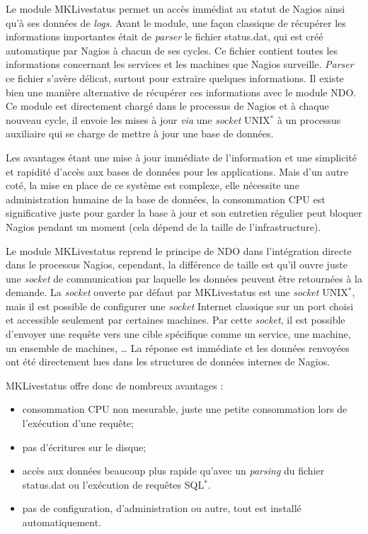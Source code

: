 Le module MKLivestatus permet un acc\`es imm\'ediat au statut de Nagios ainsi qu'\`a ses donn\'ees de \textit{logs}.
Avant le module, une fa\c{c}on classique de r\'ecup\'erer les informations importantes \'etait de \textit{parser} le fichier \textsf{status.dat}, qui est cr\'e\'e automatique par Nagios \`a chacun de ses cycles.
Ce fichier contient toutes les informations concernant les services et les machines que Nagios surveille.
\textit{Parser} ce fichier s'av\`ere d\'elicat, surtout pour extraire quelques informations.
Il existe bien une mani\`ere alternative de r\'ecup\'erer ces informations avec le module NDO.
Ce module est directement charg\'e dans le processus de Nagios et \`a chaque nouveau cycle, il envoie les mises \`a jour \textit{via} une \textit{socket} UNIX$^*$ \`a un processus auxiliaire qui se charge de mettre \`a jour une base de donn\'ees.

Les avantages \'etant une mise \`a jour imm\'ediate de l'information et une simplicit\'e et rapidit\'e d'acc\`es aux bases de donn\'ees pour les applications.
Mais d'un autre cot\'e, la mise en place de ce syst\`eme est complexe, elle n\'ecessite une administration humaine de la base de donn\'ees, la consommation CPU est significative juste pour garder la base \`a jour et son entretien r\'egulier peut bloquer Nagios pendant un moment (cela d\'epend de la taille de l'infrastructure).

Le module MKLivestatus reprend le principe de NDO dans l'int\'egration directe dans le processus Nagios, cependant, la diff\'erence de taille est qu'il ouvre juste une \textit{socket} de communication par laquelle les donn\'ees peuvent \^etre retourn\'ees \`a la demande.
La \textit{socket} ouverte par d\'efaut par MKLivestatus est une \textit{socket} UNIX$^*$, mais il est possible de configurer une \textit{socket} Internet classique sur un port choisi et accessible seulement par certaines machines.
Par cette \textit{socket}, il est possible d'envoyer une requ\^ete vers une cible sp\'ecifique comme un service, une machine, un ensemble de machines, \ldots{}
La r\'eponse est imm\'ediate et les donn\'ees renvoy\'ees ont \'et\'e directement lues dans les structures de donn\'ees internes de Nagios.

\noindent MKLivestatus offre donc de nombreux avantages :

\begin{itemize}
	\item consommation CPU non mesurable, juste une petite consommation lors de l'ex\'ecution d'une requ\^ete;
	\item pas d'\'ecritures sur le disque;
	\item acc\`es aux donn\'ees beaucoup plus rapide qu'avec un \textit{parsing} du fichier \textsf{status.dat} ou l'ex\'ecution de requ\^etes SQL$^*$.
	\item pas de configuration, d'administration ou autre, tout est install\'e automatiquement.

\end{itemize}

